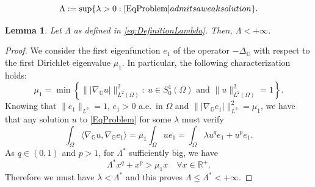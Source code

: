 \documentclass[10pt,a4paper]{amsart}
\newtheorem{lemma}{Lemma}
\def\G{\mathbb{G}}
\def\R{\mathbb{R}}
\newcommand{\m}{\mbox}
\begin{document}
\begin{equation}\label{eq:DefinitionLambda}
	\Lambda := \sup \{ \lambda >0: \eqref{EqProblem} \textrm{ admits a weak solution}\}.
\end{equation}

\begin{lemma}\label{lem:LambdaInf}
	Let $\Lambda$ as defined in \eqref{eq:DefinitionLambda}. Then, $\Lambda < +\infty$.
\end{lemma}

	\begin{proof}
	We consider the first eigenfunction $e_1$ of the operator $-\Delta_\G$
	with respect to the first Dirichlet eigenvalue $\mu_1$. In particular, the following characterization holds:
	\[
	\mu_1=\min\left\{\| |\nabla_\G u|\|^2_{L^2(\Omega)}:\ u\in S^1_0(\Omega)\m{ and }\|u\|^2_{L^2(\Omega)}=1\right\}.
	\]
	Knowing that $\|e_1\|_{L^2}=1$, $e_1>0$ a.e.~in $\Omega$ and $\| |\nabla_\G e_1|\|^2_{L^2}=\mu_1$,
	we have that any solution $u$ to \eqref{EqProblem} for some $\lambda$
	must verify
	\[
	\int_\Omega \langle \nabla_\G u,\nabla_\G e_1\rangle =\mu_1 \int_\Omega u e_1=\int_\Omega \lambda u^qe_1+u^pe_1.
	\]
	As $q\in (0,1)$ and $p>1$, for $\Lambda^*$ sufficiently big, we have
	\[
	\Lambda^*x^q+x^p>\mu_1x\quad\forall x\in \R^+.
	\]
	Therefore we must have $\lambda <\Lambda^*$ and this  proves $\Lambda\leq \Lambda^*<+\infty$.
\end{proof}
\end{document}
